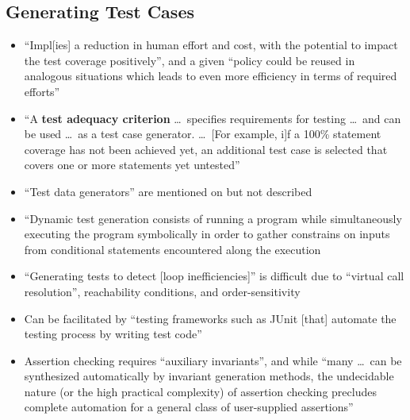 \subsection{Generating Test Cases}

\begin{itemize}
      \item ``Impl[ies] a reduction in human effort and cost, with the
            potential to impact the test coverage positively'', and a given
            ``policy could be reused in analogous situations which leads to
            even more efficiency in terms of required efforts''
            \citep[p.~1187]{Moghadam2019}
      \item ``A \textbf{test adequacy criterion} \dots\ specifies requirements
            for testing \dots\ and can be used \dots\ as a test case generator. \dots\
            [For example, i]f a 100\% statement coverage has not been achieved
            yet, an additional test case is selected that covers one or more
            statements yet untested'' \citep[p.~402]{vanVliet2000}
      \item ``Test data generators'' are mentioned on
            \citep[p.~410]{vanVliet2000} but not described
      \item ``Dynamic test generation consists of running a program while
            simultaneously executing the program symbolically in order to
            gather constrains on inputs from conditional statements encountered
            along the execution \citep[p.~23]{GodefroidAndLuchaup2011}
            \todo{OG [11, 6]}
      \item ``Generating tests to detect [loop inefficiencies]'' is difficult
            due to ``virtual call resolution'', reachability conditions, and
            order-sensitivity \citep[p.~896]{DhokAndRamanathan2016}
      \item Can be facilitated by ``testing frameworks such as JUnit [that]
            automate the testing process by writing test code''
            \citep[p.~344]{SakamotoEtAl2013}
      \item Assertion checking requires ``auxiliary invariants'', and while
            ``many \dots\ can be synthesized automatically by invariant
            generation methods, the undecidable nature (or the high practical
            complexity) of assertion checking precludes complete automation for
            a general class of user-supplied assertions''
            \citep[p.~345]{LahiriEtAl2013}
            \begin{itemize}

\end{itemize}
\end{itemize}
